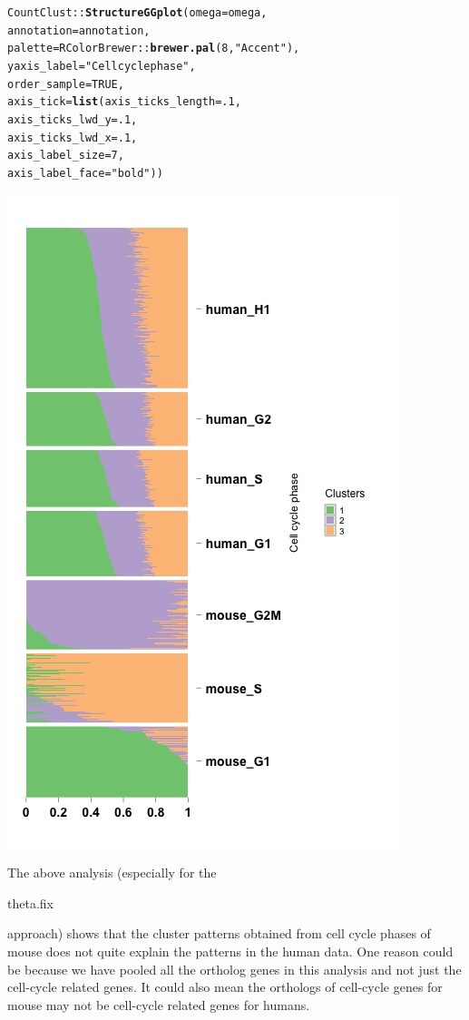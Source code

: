 \documentclass[12pt]{article}\usepackage[]{graphicx}\usepackage[usenames,dvipsnames]{color}
\makeatletter
\newcommand{\hlnum}[1]{\textcolor[rgb]{0.686,0.059,0.569}{#1}}%
\newcommand{\hlstr}[1]{\textcolor[rgb]{0.192,0.494,0.8}{#1}}%
\newcommand{\hlopt}[1]{\textcolor[rgb]{0,0,0}{#1}}%
\newcommand{\hlstd}[1]{\textcolor[rgb]{0.345,0.345,0.345}{#1}}%
\newcommand{\hlkwc}[1]{\textcolor[rgb]{0.333,0.667,0.333}{#1}}%
\newcommand{\hlkwd}[1]{\textcolor[rgb]{0.737,0.353,0.396}{\textbf{#1}}}%
\newenvironment{kframe}{%
 \def\at@end@of@kframe{}%
 \ifinner\ifhmode%
  \def\at@end@of@kframe{\end{minipage}}%
  \begin{minipage}{\columnwidth}%
 \fi\fi%
 \def\FrameCommand##1{\hskip\@totalleftmargin \hskip-\fboxsep
 \colorbox{shadecolor}{##1}\hskip-\fboxsep
     \hskip-\linewidth \hskip-\@totalleftmargin \hskip\columnwidth}%
 \MakeFramed {\advance\hsize-\width
   \@totalleftmargin\z@ \linewidth\hsize
   \@setminipage}}%
 {\par\unskip\endMakeFramed%
 \at@end@of@kframe}
\newenvironment{knitrout}{}{} %
\makeatother
\begin{document}
\begin{knitrout}
\begin{kframe}
\begin{alltt}
\hlstd{CountClust}\hlopt{::}\hlkwd{StructureGGplot}\hlstd{(}\hlkwc{omega} \hlstd{= omega,}
                \hlkwc{annotation} \hlstd{= annotation,}
                \hlkwc{palette} \hlstd{= RColorBrewer}\hlopt{::}\hlkwd{brewer.pal}\hlstd{(}\hlnum{8}\hlstd{,} \hlstr{"Accent"}\hlstd{),}
                \hlkwc{yaxis_label} \hlstd{=} \hlstr{"Cell cycle phase"}\hlstd{,}
                \hlkwc{order_sample} \hlstd{=} \hlnum{TRUE}\hlstd{,}
                \hlkwc{axis_tick} \hlstd{=} \hlkwd{list}\hlstd{(}\hlkwc{axis_ticks_length} \hlstd{=} \hlnum{.1}\hlstd{,}
                                 \hlkwc{axis_ticks_lwd_y} \hlstd{=} \hlnum{.1}\hlstd{,}
                                 \hlkwc{axis_ticks_lwd_x} \hlstd{=} \hlnum{.1}\hlstd{,}
                                 \hlkwc{axis_label_size} \hlstd{=} \hlnum{7}\hlstd{,}
                                 \hlkwc{axis_label_face} \hlstd{=} \hlstr{"bold"}\hlstd{))}
\end{alltt}
\end{kframe}
\includegraphics[width=3 in,height=5 in]{figure/structure_ortholog_classtpx_theta_fix_3-1} 

\end{knitrout}

The above analysis (especially for the \begin{verb} theta.fix \end{verb} approach) shows that the cluster patterns obtained from cell cycle phases of mouse does not quite explain the patterns in the human data. One reason could be because we have pooled all the ortholog genes in this analysis
and not just the cell-cycle related genes. It could also mean the orthologs of cell-cycle genes for mouse may not be cell-cycle related genes for humans.
\end{document}
